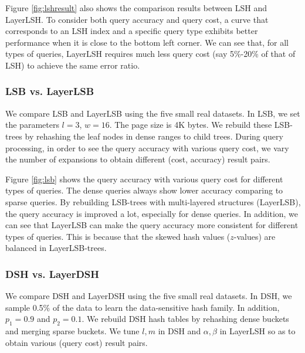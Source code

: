 Figure \ref{fig:lshresult} also shows the comparison results between LSH and LayerLSH. To consider both query accuracy and query cost, a curve that corresponds to an LSH index and a specific query type exhibits better performance when it is close to the bottom left corner. We can see that, for all types of queries, LayerLSH requires much less query cost (say 5\%-20\% of that of LSH) to achieve the same error ratio.


\subsubsection{LSB vs. LayerLSB}

We compare LSB and LayerLSB using the five small real datasets. In LSB, we set the parameters $l=3$, $w=16$. The page size is 4K bytes. We rebuild these LSB-trees by rehashing the leaf nodes in dense ranges to child trees. During query processing, in order to see the query accuracy with various query cost, we vary the number of expansions to obtain different (cost, accuracy) result pairs.

Figure \ref{fig:lsb} shows the query accuracy with various query cost for different types of queries. The dense queries always show lower accuracy comparing to sparse queries. By rebuilding LSB-trees with multi-layered structures (LayerLSB), the query accuracy is improved a lot, especially for dense queries. In addition, we can see that LayerLSB can make the query accuracy more consistent for different types of queries. This is because that the skewed hash values ($z$-values) are balanced in LayerLSB-trees.


\subsubsection{DSH vs. LayerDSH}
\label{sec:expr:dsh}

We compare DSH and LayerDSH using the five small real datasets. In DSH, we sample 0.5\% of the data to learn the data-sensitive hash family. In addition, $p_1=0.9$ and $p_2=0.1$. We rebuild DSH hash tables by rehashing dense buckets and merging sparse buckets. We tune $l,m$ in DSH and $\alpha,\beta$ in LayerLSH so as to obtain various (query cost) result pairs.

